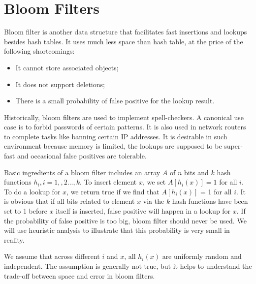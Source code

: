 \section{Bloom Filters}
Bloom filter is another data structure that facilitates fast insertions and lookups besides hash tables. It uses much less space than hash table, at the price of the following shortcomings:
\begin{itemize}
\item It cannot store associated objects;
\item It does not support deletions;
\item There is a small probability of false positive for the lookup result.
\end{itemize} 
Historically, bloom filters are used to implement spell-checkers. A canonical use case is to forbid passwords of certain patterns. It is also used in network routers to complete tasks like banning certain IP addresses. It is desirable in such  environment because memory is limited, the lookups are supposed to be super-fast and occasional false positives are tolerable. 

Basic ingredients of a bloom filter includes an array $A$ of $n$ bits and $k$ hash functions $h_i,i=1,,2\dots,k$. To insert element $x$, we set $A[h_i(x)] = 1$ for all $i$. To do a lookup for $x$, we return true if we find that $A[h_i(x)]$ = 1 for all $i$. It is obvious that if all bits related to element $x$ via the $k$ hash functions have been set to 1 before $x$ itself is inserted, false positive will happen in a lookup for $x$. If the probability of false positive is too big, bloom filter should never be used. We will use heuristic analysis to illustrate that this probability is very small in reality.

We assume that across different $i$ and $x$, all $h_i(x)$ are uniformly random and independent. The assumption is generally not true, but it helps to understand the trade-off between space and error in bloom filters. 

